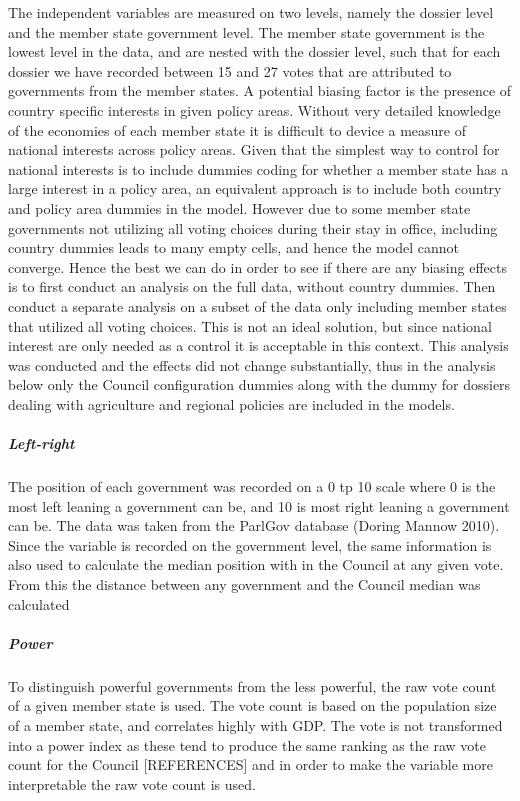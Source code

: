 The independent variables are measured on two levels, namely the dossier level and the member state government level. The member state government is the lowest level in the data, and are nested with the dossier level, such that for each dossier we have recorded between 15 and 27 votes that are attributed to governments from the member states. A potential biasing factor is the presence of country specific interests in given policy areas. Without very detailed knowledge of the economies of each member state it is difficult to device a measure of national interests across policy areas. Given that the simplest way to control for national interests is to include dummies coding for whether a member state has a large interest in a policy area,  an equivalent approach is to include both country and policy area dummies in the model. However due to  some member state governments not utilizing all voting choices during their stay in office, including country dummies leads to many empty cells, and hence the model cannot converge. Hence the best we can do in order to see if there are any biasing effects is to first conduct an analysis on the full data, without country dummies. Then conduct a separate analysis on a subset of the data only including member states that utilized all voting choices. This is not an ideal solution, but since national interest are only needed as a control it is acceptable in this context. This analysis was conducted and the effects did not change substantially, thus in the analysis below only the Council configuration dummies along with the dummy for dossiers dealing with agriculture and regional policies are included in the models. 

\subparagraph{Left-right} The position of each government was recorded on a 0 tp 10 scale where 0 is the most left leaning a government can be, and 10 is most right leaning a government can be. The data was taken from the ParlGov database (Doring Mannow 2010). Since the variable is recorded on the government level, the same information is also used to calculate the median position with in the Council at any given vote. From this the distance between any government and the Council median was calculated

\subparagraph{Power} To distinguish powerful governments from the less powerful, the raw vote count of a given member state is used. The vote count is based on the population size of a member state, and correlates highly with GDP. The vote is not transformed into a power index as these tend to produce the same ranking as the raw vote count for the Council [REFERENCES] and in order to make the variable more interpretable the raw vote count is used. 

